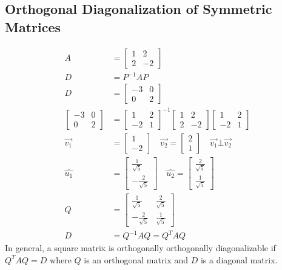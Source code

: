\documentclass{math}
\begin{document}
\subsection*{Orthogonal Diagonalization of Symmetric Matrices}
\begin{align*}
  A &= \begin{bmatrix}1 & 2 \\ 2 & -2\end{bmatrix} \\
  D &= P^{-1}AP \\
  D &= \begin{bmatrix}-3 & 0 \\ 0 & 2\end{bmatrix} \\
  \begin{bmatrix}-3 & 0 \\ 0 & 2\end{bmatrix} &=
    \begin{bmatrix}1 & 2 \\ -2 & 1\end{bmatrix}^{-1}
    \begin{bmatrix}1 & 2 \\ 2 & -2\end{bmatrix}
    \begin{bmatrix}1 & 2 \\ -2 & 1\end{bmatrix} \\
  \vec{v_1} &= \begin{bmatrix}1 \\ -2\end{bmatrix} \quad
    \vec{v_2} = \begin{bmatrix}2 \\ 1\end{bmatrix} \quad
    \vec{v_1}\bot\vec{v_2} \\
  \hat{u_1} &=
    \begin{bmatrix}\frac{1}{\sqrt{5}} \\ -\frac{2}{\sqrt{5}}\end{bmatrix} \quad
    \hat{u_2} =
    \begin{bmatrix}\frac{2}{\sqrt{5}} \\ \frac{1}{\sqrt{5}}\end{bmatrix} \\
  Q &= \begin{bmatrix}
    \frac{1}{\sqrt{5}} & \frac{2}{\sqrt{5}} \\
    -\frac{2}{\sqrt{5}} & \frac{1}{\sqrt{5}}
  \end{bmatrix} \\
  D &= Q^{-1}AQ = Q^TAQ
\end{align*}
In general, a square matrix is orthogonally orthogonally diagonalizable if
\( Q^TAQ = D \) where \( Q \) is an orthogonal matrix and \( D \) is a diagonal
matrix.
\end{document}
